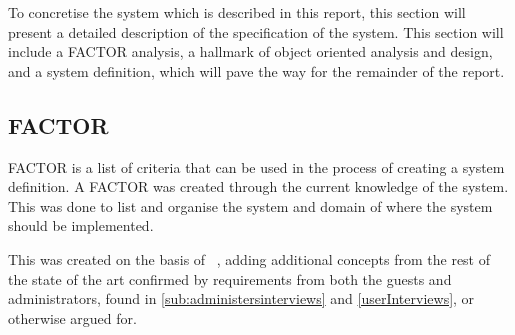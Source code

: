 To concretise the system which is described in this report, this section will present a detailed description of the specification of the system. This section will include a FACTOR analysis, a hallmark of object oriented analysis and design, and a system definition, which will pave the way for the remainder of the report.

\subsection{FACTOR}
\label{FACTOR}
FACTOR is a list of criteria that can be used in the process of creating a system definition. A FACTOR was created through the current knowledge of the system. This was done to list and organise the system and domain of where the system should be implemented.

This was created on the basis of ~\cite{sorensen2012}, adding additional concepts from the rest of the state of the art confirmed by requirements from both the guests and administrators, found in \cref{sub:administersinterviews} and \cref{userInterviews}, or otherwise argued for.
